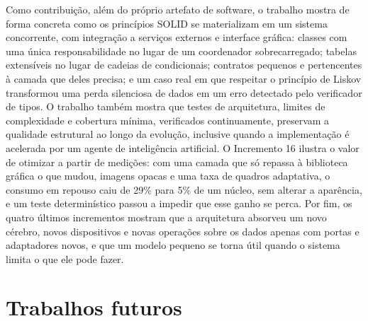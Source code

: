 Como contribuição, além do próprio artefato de software, o trabalho mostra de forma concreta como os
princípios SOLID se materializam em um sistema concorrente, com integração a serviços externos e
interface gráfica: classes com uma única responsabilidade no lugar de um coordenador sobrecarregado;
tabelas extensíveis no lugar de cadeias de condicionais; contratos pequenos e pertencentes à camada que
deles precisa; e um caso real em que respeitar o princípio de Liskov transformou uma perda silenciosa
de dados em um erro detectado pelo verificador de tipos. O trabalho também mostra que testes de
arquitetura, limites de complexidade e cobertura mínima, verificados continuamente, preservam a
qualidade estrutural ao longo da evolução, inclusive quando a implementação é acelerada por um agente
de inteligência artificial. O Incremento 16 ilustra o valor de otimizar a partir de
medições: com uma camada que só repassa à biblioteca gráfica o que mudou, imagens opacas e uma taxa de
quadros adaptativa, o consumo em repouso caiu de 29\% para 5\% de um núcleo, sem alterar a aparência,
e um teste determinístico passou a impedir que esse ganho se perca. Por fim, os quatro últimos
incrementos mostram que a arquitetura absorveu um novo cérebro, novos dispositivos e novas operações
sobre os dados apenas com portas e adaptadores novos, e que um modelo pequeno se torna útil quando o
sistema limita o que ele pode fazer.

\section{Trabalhos futuros}

